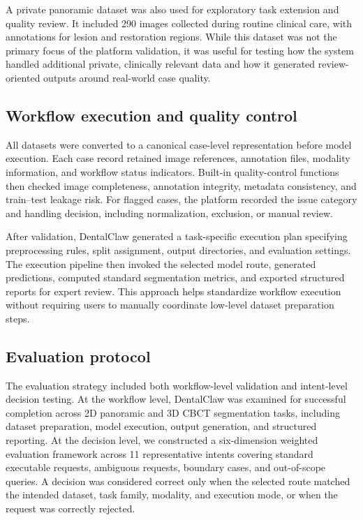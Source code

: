 \documentclass[final,5p,times,twocolumn]{elsarticle}
\begin{document}
A private panoramic dataset was also used for exploratory task extension and quality review. It included 290 images collected during routine clinical care, with annotations for lesion and restoration regions. While this dataset was not the primary focus of the platform validation, it was useful for testing how the system handled additional private, clinically relevant data and how it generated review-oriented outputs around real-world case quality.

\subsection{Workflow execution and quality control}
All datasets were converted to a canonical case-level representation before model execution. Each case record retained image references, annotation files, modality information, and workflow status indicators. Built-in quality-control functions then checked image completeness, annotation integrity, metadata consistency, and train--test leakage risk. For flagged cases, the platform recorded the issue category and handling decision, including normalization, exclusion, or manual review.

After validation, DentalClaw generated a task-specific execution plan specifying preprocessing rules, split assignment, output directories, and evaluation settings. The execution pipeline then invoked the selected model route, generated predictions, computed standard segmentation metrics, and exported structured reports for expert review. This approach helps standardize workflow execution without requiring users to manually coordinate low-level dataset preparation steps.

\subsection{Evaluation protocol}
The evaluation strategy included both workflow-level validation and intent-level decision testing. At the workflow level, DentalClaw was examined for successful completion across 2D panoramic and 3D CBCT segmentation tasks, including dataset preparation, model execution, output generation, and structured reporting. At the decision level, we constructed a six-dimension weighted evaluation framework across 11 representative intents covering standard executable requests, ambiguous requests, boundary cases, and out-of-scope queries. A decision was considered correct only when the selected route matched the intended dataset, task family, modality, and execution mode, or when the request was correctly rejected.
\end{document}
